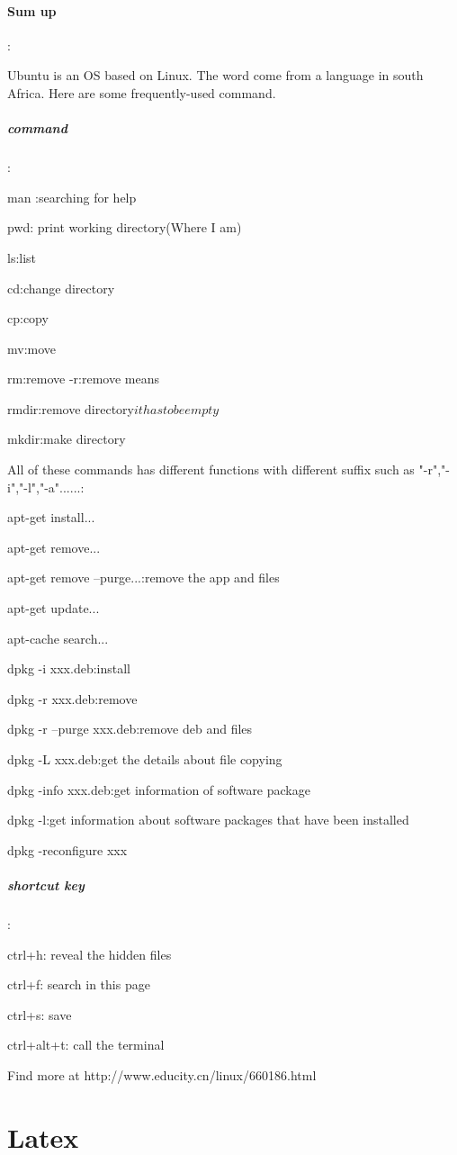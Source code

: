\documentclass{report}
\begin{document}
	\paragraph{Sum up}:\par
	Ubuntu is an OS based on Linux. The word come from a language in south Africa. Here are some frequently-used command.
	\subparagraph{command}
	:\par
	man \(\):searching for help\par
	pwd: print working directory(Where I am)\par
	ls:list\par
	cd:change directory\par
	cp:copy\par
	mv:move\par
	rm:remove -r:remove means \par
	rmdir:remove directory\(it has to be empty\)\par
	mkdir:make directory\par
	All of these commands has different functions with different suffix
	such as "-r","-i","-l","-a"......:\par
	apt-get install...\par
	apt-get remove...\par
	apt-get remove --purge...:remove the app and files\par
	apt-get update...\par
	apt-cache search...\par
	dpkg -i xxx.deb:install\par
	dpkg -r xxx.deb:remove\par
	dpkg -r --purge xxx.deb:remove deb and files\par
	dpkg -L xxx.deb:get the details about file copying\par
	dpkg -info xxx.deb:get information of software package\par
	dpkg -l:get information about software packages that have been installed\par
	dpkg -reconfigure xxx\par
	\subparagraph{shortcut key}:\par
	ctrl+h: reveal the hidden files\par
	ctrl+f: search in this page\par
	ctrl+s: save\par
	ctrl+alt+t: call the terminal\par
	Find more at http://www.educity.cn/linux/660186.html
\section{Latex}
\end{document}
